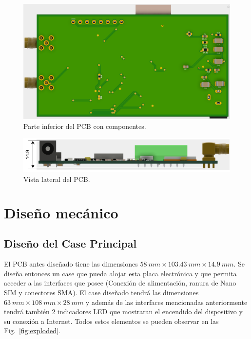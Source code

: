 \begin{figure}[hbtp!]
\centering
\includegraphics[width=\textwidth]{board_com_bottom.png}
\caption{Parte inferior del PCB con componentes.}
\label{fig:board_bottom_con}
\end{figure}

\begin{figure}[hbtp!]
\centering
\includegraphics[width=\textwidth]{board_side_dim.pdf}
\caption{Vista lateral del PCB.}
\label{fig:board_side_con}
\end{figure}


\section{Diseño mecánico}

\subsection{Diseño del Case Principal}

El PCB antes diseñado tiene las dimensiones $\SI{58}{mm} \times \SI{103.43}{mm} \times \SI{14.9}{mm}$. Se diseña entonces un case que pueda alojar esta placa electrónica y que permita acceder a las interfaces que posee (Conexión de alimentación, ranura de Nano SIM y conectores SMA). El case diseñado tendrá las dimensiones $\SI{63}{mm} \times \SI{108}{mm} \times \SI{28}{mm}$ y además de las interfaces mencionadas anteriormente tendrá también 2 indicadores LED que mostraran el encendido del dispositivo y su conexión a Internet. Todos estos elementos se pueden observar en las Fig.~\ref{fig:exploded}.



